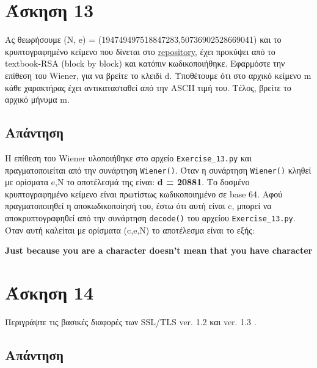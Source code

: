 \documentclass[12pt]{article}
\begin{document}
\hfill \blacksquare

\section*{Άσκηση 13}

Aς θεωρήσουμε (N, e) = (194749497518847283,50736902528669041) και το
κρυπτογραφημένο κείμενο που δίνεται στο 
\href{https://github.com/drazioti/book_crypto/blob/master/public_key_crypto/7.2}{repository}, έχει προκύψει από το textbook-RSA (block by block) και κατόπιν κωδικοποιήθηκε. Εφαρμόστε την επίθεση του
Wiener, για να βρείτε το κλειδί d.
Υποθέτουμε ότι στο αρχικό κείμενο m κάθε χαρακτήρας έχει αντικατασταθεί από την ASCII τιμή του. Τέλος, βρείτε το αρχικό μήνυμα
m.

\subsection*{Απάντηση}

Η επίθεση του Wiener υλοποιήθηκε στο αρχείο \texttt{Exercise\_13.py} και πραγματοποιείται από την συνάρτηση \texttt{Wiener()}. Όταν η συνάρτηση \texttt{Wiener()} κληθεί με ορίσματα e,N το αποτέλεσμά της είναι:  \textbf{d = 20881}.  
\newline
\newline
Το δοσμένο κρυπτογραφημένο κείμενο είναι πρωτίστως κωδικοποιημένο σε base 64. Αφού πραγματοποιηθεί η αποκωδικοποίησή του, έστω ότι αυτή είναι c, μπορεί να αποκρυπτογραφηθεί από την συνάρτηση \texttt{decode()} του αρχείου \texttt{Exercise\_13.py}. Όταν αυτή καλείται με ορίσματα (c,e,N) το αποτέλεσμα είναι το εξής:
\begin{center}
    \textbf{Just because you are a character doesn't mean that you have character}
\end{center}

\hfill \blacksquare

\newpage

\section*{Άσκηση 14}

Περιγράψτε τις βασικές διαφορές των SSL/TLS ver. 1.2 και ver. 1.3 . 


\subsection*{Απάντηση}
\end{document}
